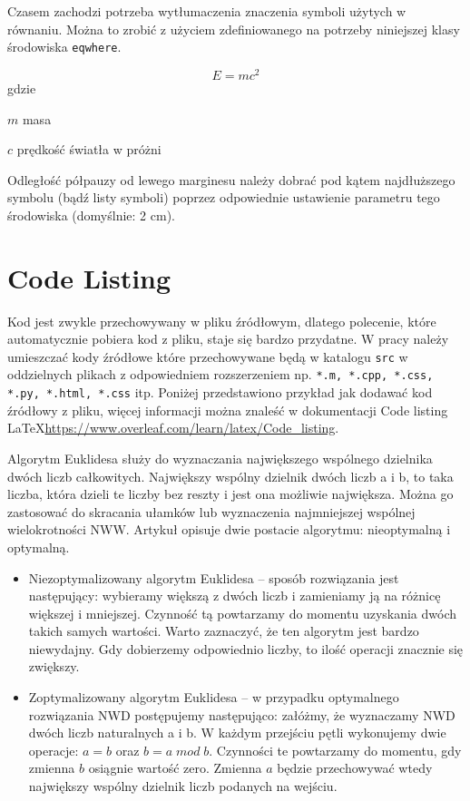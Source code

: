 Czasem zachodzi potrzeba wytłumaczenia znaczenia symboli użytych w równaniu. Można to zrobić z użyciem zdefiniowanego na potrzeby niniejszej klasy środowiska \texttt{eqwhere}.

\begin{equation}
    E = mc^2
\end{equation}
gdzie
\begin{eqwhere}[2cm]
    \item[$m$] masa
    \item[$c$] prędkość światła w próżni
\end{eqwhere}

Odległość półpauzy od lewego marginesu należy dobrać pod kątem najdłuższego symbolu (bądź listy symboli) poprzez odpowiednie ustawienie parametru tego środowiska (domyślnie: 2 cm).

\section{Code Listing}

Kod jest zwykle przechowywany w pliku źródłowym, dlatego polecenie, które automatycznie pobiera kod z pliku, staje się bardzo przydatne. W pracy należy umieszczać kody źródłowe które przechowywane będą w katalogu \texttt{src} w oddzielnych plikach z odpowiedniem rozszerzeniem np. \texttt{*.m, *.cpp, *.css, *.py, *.html, *.css} itp. Poniżej przedstawiono przykład jak dodawać kod źródłowy z pliku, więcej informacji można znaleść w dokumentacji Code listing \LaTeX  \url{https://www.overleaf.com/learn/latex/Code_listing}.

Algorytm Euklidesa służy do wyznaczania największego wspólnego dzielnika dwóch liczb całkowitych. Największy wspólny dzielnik dwóch liczb a i  b, to taka liczba, która dzieli te liczby bez reszty i jest ona możliwie największa. Można go zastosować do skracania ułamków lub wyznaczenia najmniejszej wspólnej wielokrotności NWW. Artykuł opisuje dwie postacie algorytmu: nieoptymalną i optymalną.

\begin{itemize}
    \item Niezoptymalizowany algorytm Euklidesa -- sposób rozwiązania jest następujący: wybieramy większą z dwóch liczb i zamieniamy ją na różnicę większej i mniejszej. Czynność tą powtarzamy do momentu uzyskania dwóch takich samych wartości. Warto zaznaczyć, że ten algorytm jest bardzo niewydajny. Gdy dobierzemy odpowiednio liczby, to ilość operacji znacznie się zwiększy.
    \item Zoptymalizowany algorytm Euklidesa -- w przypadku optymalnego rozwiązania NWD postępujemy następująco: załóżmy, że wyznaczamy NWD dwóch liczb naturalnych a i b. W każdym przejściu pętli wykonujemy dwie operacje: $a = b$ oraz $b = a \; mod \; b$. Czynności te powtarzamy do momentu, gdy zmienna $b$ osiągnie wartość zero. Zmienna $a$ będzie przechowywać wtedy największy wspólny dzielnik liczb podanych na wejściu.
\end{itemize}

